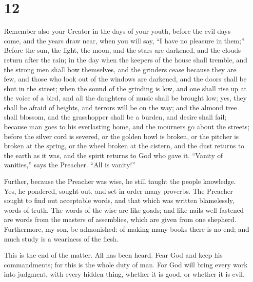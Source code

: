 \hypertarget{section-11}{%
\section{12}\label{section-11}}

 Remember also your Creator in the days of your youth,
before the evil days come, and the years draw near, when you will say,
``I have no pleasure in them;''  Before the sun, the light,
the moon, and the stars are darkened, and the clouds return after the
rain;  in the day when the keepers of the house shall
tremble, and the strong men shall bow themselves, and the grinders cease
because they are few, and those who look out of the windows are
darkened,  and the doors shall be shut in the street; when
the sound of the grinding is low, and one shall rise up at the voice of
a bird, and all the daughters of music shall be brought low;
 yes, they shall be afraid of heights, and terrors will be
on the way; and the almond tree shall blossom, and the grasshopper shall
be a burden, and desire shall fail; because man goes to his everlasting
home, and the mourners go about the streets;  before the
silver cord is severed, or the golden bowl is broken, or the pitcher is
broken at the spring, or the wheel broken at the cistern, 
and the dust returns to the earth as it was, and the spirit returns to
God who gave it.  ``Vanity of vanities,'' says the Preacher.
``All is vanity!''

 Further, because the Preacher was wise, he still taught the
people knowledge. Yes, he pondered, sought out, and set in order many
proverbs.  The Preacher sought to find out acceptable
words, and that which was written blamelessly, words of truth.
 The words of the wise are like goads; and like nails well
fastened are words from the masters of assemblies, which are given from
one shepherd.  Furthermore, my son, be admonished: of
making many books there is no end; and much study is a weariness of the
flesh.

 This is the end of the matter. All has been heard. Fear
God and keep his commandments; for this is the whole duty of man.
 For God will bring every work into judgment, with every
hidden thing, whether it is good, or whether it is evil.
